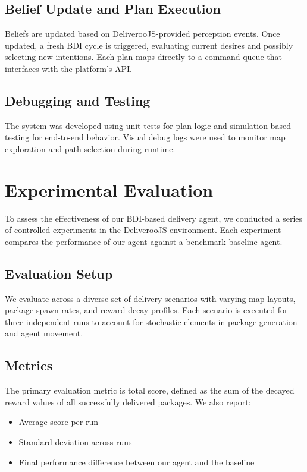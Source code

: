 \documentclass[conference]{IEEEtran}
\begin{document}
\subsection{Belief Update and Plan Execution}
Beliefs are updated based on DeliverooJS-provided perception events. Once updated, a fresh BDI cycle is triggered, evaluating current desires and possibly selecting new intentions. Each plan maps directly to a command queue that interfaces with the platform's API.

\subsection{Debugging and Testing}
The system was developed using unit tests for plan logic and simulation-based testing for end-to-end behavior. Visual debug logs were used to monitor map exploration and path selection during runtime.

\section{Experimental Evaluation}

To assess the effectiveness of our BDI-based delivery agent, we conducted a series of controlled experiments in the DeliverooJS environment. Each experiment compares the performance of our agent against a benchmark baseline agent.

\subsection{Evaluation Setup}

We evaluate across a diverse set of delivery scenarios with varying map layouts, package spawn rates, and reward decay profiles. Each scenario is executed for three independent runs to account for stochastic elements in package generation and agent movement.

\subsection{Metrics}

The primary evaluation metric is total score, defined as the sum of the decayed reward values of all successfully delivered packages. We also report:
\begin{itemize}
	\item Average score per run
	\item Standard deviation across runs
	\item Final performance difference between our agent and the baseline
\end{itemize}
\end{document}
